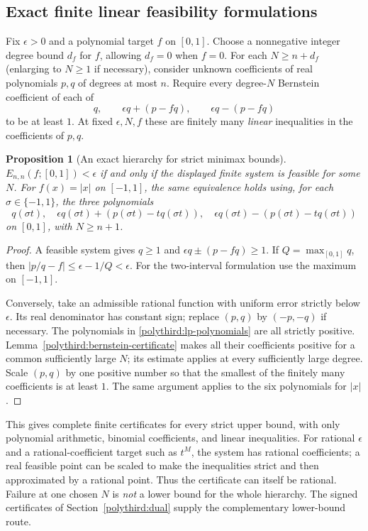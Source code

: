 \documentclass[11pt]{article}
\newtheorem{proposition}[theorem]{Proposition}
\theoremstyle{remark}
\numberwithin{equation}{section}
\begin{document}
\subsection{Exact finite linear feasibility formulations}
Fix $\epsilon>0$ and a polynomial target $f$ on $[0,1]$.  Choose a
nonnegative integer degree bound $d_f$ for $f$, allowing $d_f=0$ when
$f=0$.  For each $N\ge n+d_f$ (enlarging to $N\ge1$ if necessary), consider unknown
coefficients of real polynomials $p,q$ of degrees at most $n$.  Require
every degree-$N$ Bernstein coefficient of each of
\begin{equation}\label{polythird:lp-polynomials}
 q,\qquad \epsilon q+(p-fq),\qquad \epsilon q-(p-fq)
\end{equation}
to be at least $1$.  At fixed $\epsilon,N,f$ these are finitely many
\emph{linear} inequalities in the coefficients of $p,q$.

\begin{proposition}[An exact hierarchy for strict minimax bounds]
\label{polythird:lp-equivalence}
$E_{n,n}(f;[0,1])<\epsilon$ if and only if the displayed finite system
is feasible for some $N$.  For $f(x)=|x|$ on $[-1,1]$, the same
equivalence holds using, for each $\sigma\in\{-1,1\}$, the three
polynomials
\[
 q(\sigma t),\quad
 \epsilon q(\sigma t)+(p(\sigma t)-tq(\sigma t)),\quad
 \epsilon q(\sigma t)-(p(\sigma t)-tq(\sigma t))
\]
on $[0,1]$, with $N\ge n+1$.
\end{proposition}
\begin{proof}
A feasible system gives $q\ge1$ and
$\epsilon q\pm(p-fq)\ge1$.  If $Q=\max_{[0,1]}q$, then
$|p/q-f|\le\epsilon-1/Q<\epsilon$.
For the two-interval formulation use the maximum on $[-1,1]$.

Conversely, take an admissible rational function with uniform error
strictly below $\epsilon$.  Its real denominator has constant sign;
replace $(p,q)$ by $(-p,-q)$ if necessary.  The polynomials in
\eqref{polythird:lp-polynomials} are all strictly positive.
Lemma~\ref{polythird:bernstein-certificate} makes all their coefficients
positive for a common sufficiently large $N$; its estimate applies at
every sufficiently large degree.  Scale $(p,q)$ by one positive number
so that the smallest of the finitely many coefficients is at least $1$.
The same argument applies to the six polynomials for $|x|$.
\end{proof}

This gives complete finite certificates for every strict upper bound,
with only polynomial arithmetic, binomial coefficients, and linear
inequalities.  For rational $\epsilon$ and a rational-coefficient
target such as $t^M$, the system has rational coefficients; a real
feasible point can be scaled to make the inequalities strict and then
approximated by a rational point.  Thus the certificate can itself be
rational.  Failure at one chosen $N$ is \emph{not} a lower bound for the
whole hierarchy.  The signed certificates of
Section~\ref{polythird:dual} supply the complementary lower-bound route.
\end{document}

